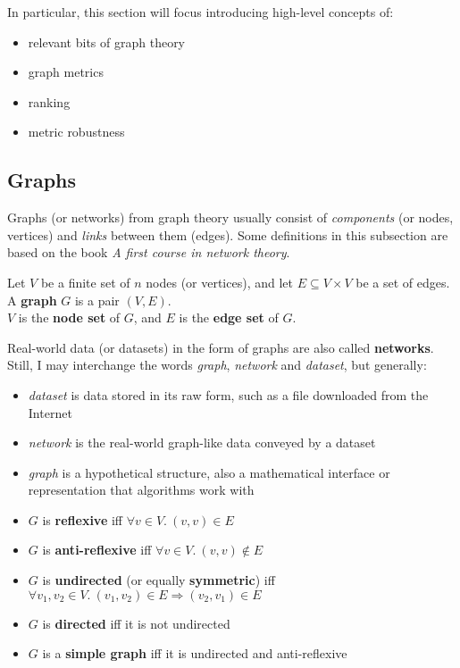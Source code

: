 In particular, this section will focus introducing high-level concepts of:
\begin{itemize}
    \item relevant bits of graph theory
    \item graph metrics
    \item ranking
    \item metric robustness
\end{itemize}

\subsection{Graphs}

Graphs (or networks) from graph theory usually consist of \textit{components} (or nodes, vertices) and \textit{links} between them (edges).
Some definitions in this subsection are based on the book \textsl{A first course in network theory}\cite{Estrada2017}.

\begin{definition}[Graph]
    Let $V$ be a finite set of $n$ nodes (or vertices), and let $E \subseteq V \times V$ be a set of edges.\\
    A \textbf{graph} $G$ is a pair $(V, E)$.\\
    $V$ is the \textbf{node set} of $G$, and $E$ is the \textbf{edge set} of $G$.
\end{definition}

Real-world data (or datasets) in the form of graphs are also called \textbf{networks}.
Still, I may interchange the words \textsl{graph}, \textsl{network} and \textsl{dataset}, but generally:
\begin{itemize}
    \item \textsl{dataset} is data stored in its raw form, such as a file downloaded from the Internet
    \item \textsl{network} is the real-world graph-like data conveyed by a dataset
    \item \textsl{graph} is a hypothetical structure, also a mathematical interface or representation that algorithms work with
\end{itemize}

\begin{definition}
    \begin{itemize}[leftmargin=*]
        \item $G$ is \textbf{reflexive} iff $\forall v \in V.\ (v, v) \in E$
        \item $G$ is \textbf{anti-reflexive} iff $\forall v \in V.\ (v, v) \notin E$
        \item $G$ is \textbf{undirected} (or equally \textbf{symmetric}) iff $\forall v_1, v_2 \in V.\ (v_1, v_2) \in E \Rightarrow (v_2, v_1) \in E$
        \item $G$ is \textbf{directed} iff it is not undirected
        \item $G$ is a \textbf{simple graph} iff it is undirected and anti-reflexive
    \end{itemize}
\end{definition}

